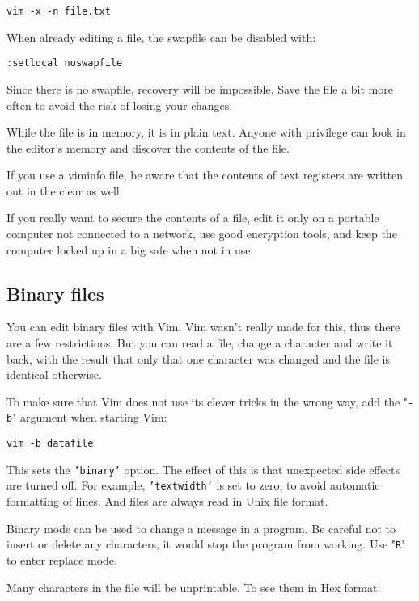 \begin{Verbatim}[samepage=true]
 vim -x -n file.txt
\end{Verbatim}

When already editing a file, the swapfile can be disabled with:

\begin{Verbatim}[samepage=true]
 :setlocal noswapfile
\end{Verbatim}

Since there is no swapfile, recovery will be impossible.
Save the file a bit more often to avoid the risk of losing your changes.

While the file is in memory, it is in plain text.
Anyone with privilege can look in the editor's memory and discover the contents of the file.

If you use a viminfo file, be aware that the contents of text registers are written out in the clear as well.

If you really want to secure the contents of a file, edit it only on a portable computer not connected to a network, use good encryption tools, and keep the computer locked up in a big safe when not in use.
\subsection{Binary files}
You can edit binary files with Vim.
Vim wasn't really made for this, thus there are a few restrictions.
But you can read a file, change a character and write it back, with the result that only that one character was changed and the file is identical otherwise.

To make sure that Vim does not use its clever tricks in the wrong way, add the "\texttt{-b}" argument when starting Vim:

\begin{Verbatim}[samepage=true]
 vim -b datafile
\end{Verbatim}

This sets the \texttt{'binary'} option.
The effect of this is that unexpected side effects are turned off.
For example, \texttt{'textwidth'} is set to zero, to avoid automatic formatting of lines.
And files are always read in Unix file format.

Binary mode can be used to change a message in a program.
Be careful not to insert or delete any characters, it would stop the program from working.
Use "\texttt{R}" to enter replace mode.

Many characters in the file will be unprintable.
To see them in Hex format:

